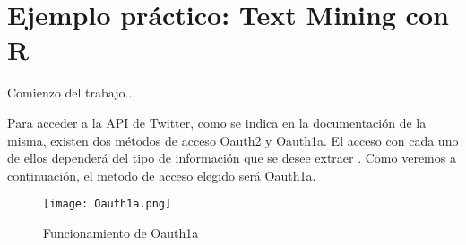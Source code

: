
\chapter{Ejemplo práctico: Text Mining con R}
\label{cha:Text-mining-r}

Comienzo del trabajo...


Para acceder a la API de Twitter, como se indica en la documentación de la misma, existen dos métodos de 
acceso Oauth2 y Oauth1a. El acceso con cada uno de ellos dependerá del tipo de información que se desee 
extraer \cite{oauth1a}. Como veremos a continuación, el metodo de acceso elegido será Oauth1a.

\begin{figure}[tphb]
  		   \centering
     		   \texttt{[image: Oauth1a.png]}
  		   \caption{Funcionamiento de Oauth1a}
  		   \label{img:oauth1a}
\end{figure}






